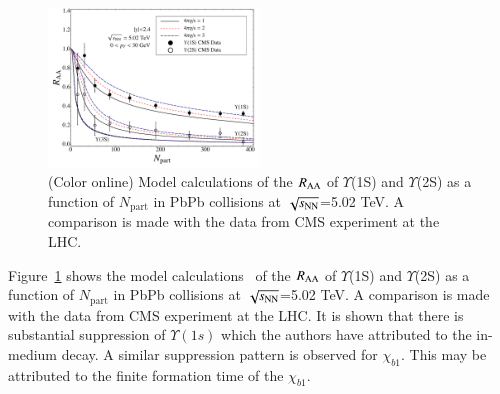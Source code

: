 {{\begin{figure}[t]
\begin{center}
\includegraphics[width=0.5\textwidth]{Figures/Fig22_YnsRAA_NPart_StricklandModel.pdf}
\end{center}
\vspace{-7mm}
\caption{(Color online) Model calculations \cite{Krouppa:2018lkt} of the $R_{\rm AA}$
  of $\Upsilon$(1S) and $\Upsilon$(2S) as a function of $N_{\text{part}}$
  in PbPb collisions at $\sqrt{s_{\rm NN}}$=5.02 TeV.   
  A comparison is made with the data from CMS experiment \cite{Sirunyan:2018nsz} at
  the LHC.}
\label{fig:raasep}
\end{figure}

Figure~\ref{fig:raasep} shows the model calculations~\cite{Krouppa:2018lkt}
of the $R_{\rm AA}$ of $\Upsilon$(1S) and $\Upsilon$(2S) as a function of
$N_{\text{part}}$  in PbPb collisions at $\sqrt{s_{\rm NN}}$=5.02 TeV.   
  A comparison is made with the data from CMS experiment \cite{Sirunyan:2018nsz} at
  the LHC. It is shown that there is substantial 
suppression  of $\Upsilon(1s)$ which the authors have attributed to the in-medium decay.  
A  similar suppression pattern is observed for $\chi_{b1}$.
This may be attributed to the finite formation time of the $\chi_{b1}$. 





}}
